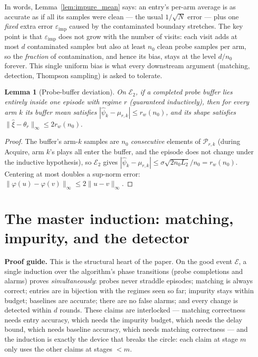 \documentclass[11pt]{article}
\newtheorem{lemma}{Lemma}
\newcommand{\Ecal}{\mathcal E}
\newcommand{\Pcal}{\mathcal P}
\newcommand{\phic}{\varphi}
\newcommand{\eimp}{\varepsilon_{\mathrm{imp}}}
\newcommand{\proofguide}[1]{\par\smallskip\noindent\textcolor{blue!65!black}{\textbf{Proof guide.} #1}\par\smallskip}
\begin{document}
In words, Lemma~\ref{lem:impure_mean} says: an entry's per-arm average is as accurate as if all its samples were clean --- the usual $1/\sqrt{N}$ error --- plus one \emph{fixed} extra error $\eimp$ caused by the contaminated boundary stretches. The key point is that $\eimp$ does not grow with the number of visits: each visit adds at most $d$ contaminated samples but also at least $n_0$ clean probe samples per arm, so the \emph{fraction} of contamination, and hence its bias, stays at the level $d/n_0$ forever. This single uniform bias is what every downstream argument (matching, detection, Thompson sampling) is asked to tolerate.

\begin{lemma}[Probe-buffer deviation]
\label{lem:buffer}
On $\Ecal_2$, if a completed probe buffer lies entirely inside one episode with regime $r$ (guaranteed inductively), then for every arm $k$ its buffer mean satisfies $|\widehat\psi_k-\mu_{r,k}|\le r_w(n_0)$, and its shape satisfies $\|\widehat\xi-\theta_r\|_\infty\le 2r_w(n_0)$.
\end{lemma}

\begin{proof}
The buffer's arm-$k$ samples are $n_0$ \emph{consecutive} elements of $\Pcal_{r,k}$ (during Acquire, arm $k$'s plays all enter the buffer, and the episode does not change under the inductive hypothesis), so $\Ecal_2$ gives $|\widehat\psi_k-\mu_{r,k}|\le\sigma\sqrt{2n_0L_2}/n_0=r_w(n_0)$. Centering at most doubles a sup-norm error: $\|\phic(u)-\phic(v)\|_\infty\le2\|u-v\|_\infty$.
\end{proof}

\section{The master induction: matching, impurity, and the detector}
\label{sec:master}

\proofguide{This is the structural heart of the paper. On the good event $\Ecal$, a single induction over the algorithm's phase transitions (probe completions and alarms) proves \emph{simultaneously}: probes never straddle episodes; matching is always correct; entries are in bijection with the regimes seen so far; impurity stays within budget; baselines are accurate; there are no false alarms; and every change is detected within $d$ rounds. These claims are interlocked --- matching correctness needs entry accuracy, which needs the impurity budget, which needs the delay bound, which needs baseline accuracy, which needs matching correctness --- and the induction is exactly the device that breaks the circle: each claim at stage $m$ only uses the other claims at stages $<m$.}
\end{document}

